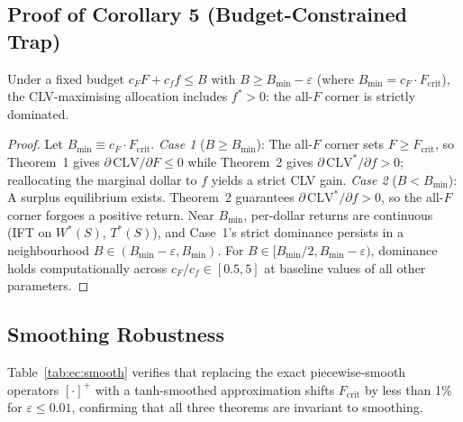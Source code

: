 \documentclass[msom,dblanonrev]{informs4}
\begin{document}
\subsection{Proof of Corollary 5 (Budget-Constrained Trap)}\label{sec:ec:proof5}

\setcounter{corollary}{4}
\begin{corollary}
Under a fixed budget $c_F F + c_f f \leq B$ with $B \geq B_{\min} - \varepsilon$ (where $B_{\min} = c_F \cdot F_{\mathrm{crit}}$), the CLV-maximising allocation includes $f^* > 0$: the all-$F$ corner is strictly dominated.
\end{corollary}

\begin{proof}
Let $B_{\min} \equiv c_F \cdot F_{\mathrm{crit}}$. \textit{Case 1} ($B \geq B_{\min}$): The all-$F$ corner sets $F \geq F_{\mathrm{crit}}$, so Theorem~1 gives $\partial\,\mathrm{CLV}/\partial F \leq 0$ while Theorem~2 gives $\partial\,\mathrm{CLV}^*/\partial f > 0$; reallocating the marginal dollar to $f$ yields a strict CLV gain.
\textit{Case 2} ($B < B_{\min}$): A surplus equilibrium exists. Theorem~2 guarantees $\partial\,\mathrm{CLV}^*/\partial f > 0$, so the all-$F$ corner forgoes a positive return. Near $B_{\min}$, per-dollar returns are continuous (IFT on $W^*(S)$, $T^*(S)$), and Case~1's strict dominance persists in a neighbourhood $B \in (B_{\min}{-}\varepsilon, B_{\min})$. For $B \in [B_{\min}/2, B_{\min}{-}\varepsilon)$, dominance holds computationally across $c_F/c_f \in [0.5, 5]$ at baseline values of all other parameters. \Halmos
\end{proof}


\subsection{Smoothing Robustness}\label{sec:ec:smoothing}

Table~\ref{tab:ec:smooth} verifies that replacing the exact piecewise-smooth operators $[\cdot]^+$ with a tanh-smoothed approximation shifts $F_{\mathrm{crit}}$ by less than 1\% for $\varepsilon \leq 0.01$, confirming that all three theorems are invariant to smoothing.
\end{document}
